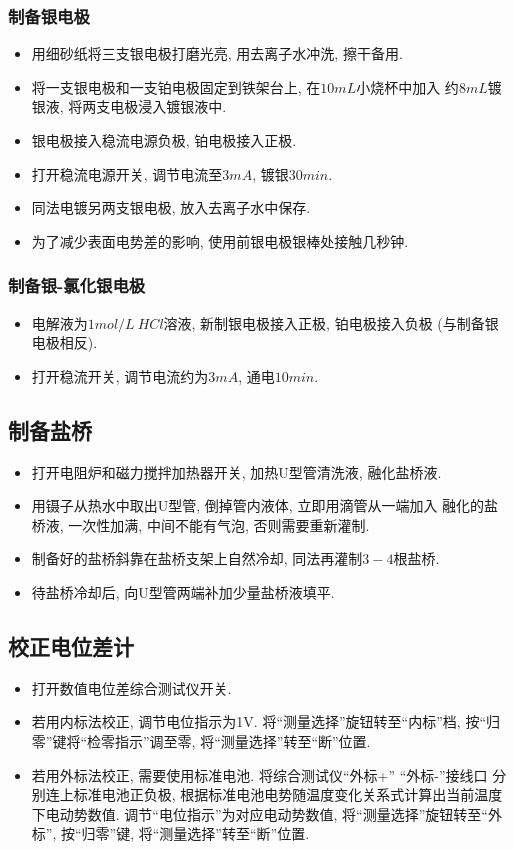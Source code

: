 \documentclass[a4paper]{article}
\begin{document}
\subsubsection{制备银电极}
\begin{itemize}
	\item 用细砂纸将三支银电极打磨光亮, 用去离子水冲洗, 擦干备用.
	\item 将一支银电极和一支铂电极固定到铁架台上, 在$10mL$小烧杯中加入
	约$8mL$镀银液, 将两支电极浸入镀银液中.
	\item 银电极接入稳流电源负极, 铂电极接入正极.
	\item 打开稳流电源开关, 调节电流至$3mA$, 镀银$30min$.
	\item 同法电镀另两支银电极, 放入去离子水中保存.
	\item 为了减少表面电势差的影响, 使用前银电极银棒处接触几秒钟.
\end{itemize}
\subsubsection{制备银-氯化银电极}
\begin{itemize}
	\item 电解液为$1mol/L~HCl$溶液, 新制银电极接入正极, 铂电极接入负极
	(与制备银电极相反).
	\item 打开稳流开关, 调节电流约为$3mA$, 通电$10min$.
\end{itemize}
\subsection{制备盐桥}
\begin{itemize}
	\item 打开电阻炉和磁力搅拌加热器开关, 加热U型管清洗液, 融化盐桥液.
	\item 用镊子从热水中取出U型管, 倒掉管内液体, 立即用滴管从一端加入
	融化的盐桥液, 一次性加满, 中间不能有气泡, 否则需要重新灌制.
	\item 制备好的盐桥斜靠在盐桥支架上自然冷却, 同法再灌制$3-4$根盐桥.
	\item 待盐桥冷却后, 向U型管两端补加少量盐桥液填平.
\end{itemize}
\subsection{校正电位差计}
\begin{itemize}
	\item 打开数值电位差综合测试仪开关.
	\item 若用内标法校正, 调节电位指示为1V. 将``测量选择''旋钮转至``内标''档,
	按``归零''键将``检零指示''调至零, 将``测量选择''转至``断''位置.
	\item 若用外标法校正, 需要使用标准电池. 将综合测试仪``外标+'' ``外标-''接线口
	分别连上标准电池正负极, 根据标准电池电势随温度变化关系式计算出当前温度下电动势数值.
	调节``电位指示''为对应电动势数值, 将``测量选择''旋钮转至``外标'', 按``归零''键, 
	将``测量选择''转至``断''位置.
\end{itemize}
\end{document}
